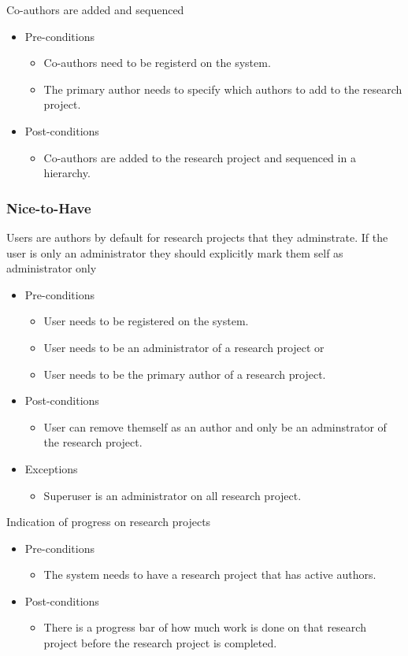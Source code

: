 \documentclass[a4paper,12pt]{report}
\begin{document}
	Co-authors are added and sequenced
	\begin{itemize}
		\item Pre-conditions
			\begin{itemize}
				\item Co-authors need to be registerd on the system.
				\item The primary author needs to specify which authors to add to the research project.
			\end{itemize}
		\item Post-conditions
			\begin{itemize}
				\item Co-authors are added to the research project and sequenced in a hierarchy.
			\end{itemize}
	\end{itemize}

\subsubsection{Nice-to-Have}
	Users are authors by default for research projects that they adminstrate. If the user is only an administrator they should explicitly mark them self as administrator only
	\begin{itemize}
		\item Pre-conditions
			\begin{itemize}
				\item User needs to be registered on the system.
				\item User needs to be an administrator of a research project or
				\item User needs to be the primary author of a research project.
			\end{itemize}
		\item Post-conditions
			\begin{itemize}
				\item User can remove themself as an author and only be an adminstrator of the research project.
			\end{itemize}
		\item Exceptions
			\begin{itemize}
				\item Superuser is an administrator on all research project.
			\end{itemize}
	\end{itemize}

	Indication of progress on research projects
	\begin{itemize}
		\item Pre-conditions
			\begin{itemize}
				\item The system needs to have a research project that has active authors.
			\end{itemize}
		\item Post-conditions
			\begin{itemize}
				\item There is a progress bar of how much work is done on that research project before the research project is completed.
			\end{itemize}
	\end{itemize}
\end{document}

